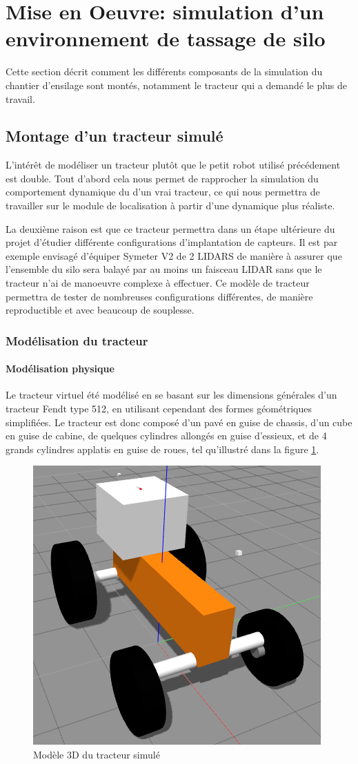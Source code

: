 \documentclass[12pt,a4paper]{report}
\begin{document}
		
	\section{Mise en Oeuvre: simulation d'un environnement de tassage de silo}
	
	Cette section décrit comment les différents composants de la simulation du chantier d'ensilage sont montés, notamment le tracteur qui a demandé le plus de travail.
	  
		\subsection{Montage d'un tracteur simulé}
		L'intérêt de modéliser un tracteur plutôt que le petit robot utilisé précédement est double. Tout d'abord cela nous permet de rapprocher la simulation du comportement dynamique du d'un vrai tracteur, ce qui nous permettra de travailler sur le module de localisation à partir d'une dynamique plus réaliste. 
		
		\para La deuxième raison est que ce tracteur permettra dans un étape ultérieure du projet d'étudier différente configurations d'implantation de capteurs. Il est par exemple envisagé d'équiper Symeter V2 de 2 LIDARS de manière à assurer que l'ensemble du silo sera balayé par au moins un faisceau LIDAR sans que le tracteur n'ai de manoeuvre complexe à effectuer. Ce modèle de tracteur permettra de tester de nombreuses configurations différentes, de manière reproductible et avec beaucoup de souplesse.
		
		\subsubsection{Modélisation du tracteur}
			\paragraph{Modélisation physique}
			Le tracteur virtuel été modélisé en se basant sur les dimensions générales d'un tracteur Fendt type 512, en utilisant cependant des formes géométriques simplifiées. Le tracteur est donc composé d'un pavé en guise de chassis, d'un cube en guise de cabine, de quelques cylindres allongés en guise d'essieux, et de 4 grands cylindres applatis en guise de roues, tel qu'illustré dans la figure \ref{fig:tracteur3d}. 
			
			\begin{figure}[h!]
				\centering
				\includegraphics[width=0.4\linewidth]{img/tracteur3d}
				\caption[tracteur3d]{Modèle 3D du tracteur simulé}
				\label{fig:tracteur3d}
			\end{figure}
		
\end{document}
